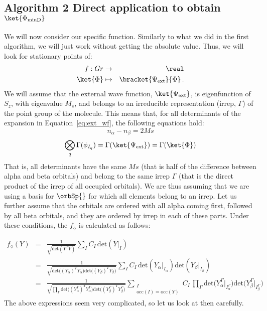 \documentclass[a4paper,11pt]{article}
\newcommand{\irp}{\ensuremath{\Gamma}}
\begin{document}
\subsection{\textsf{\LARGE Algorithm 2}
  Direct application to obtain $\ket{\Phi_\text{minD}}$}
\label{sec:alg_two}

We will now consider our specific function.
Similarly to what we did in the first algorithm, we will just work without getting the absolute value.
Thus, we will look for stationary points of:
\begin{eqnarray}
  f : Gr &\to& \real\\
  \ket{\Phi} &\mapsto& \bracket{\Psi_\text{ext}}{\Phi}\,.
\end{eqnarray}
We will assume that the external wave function, $\ket{\Psi_\text{ext}}$, is eigenfunction of $S_z$, with eigenvalue $M_s$, and belongs to an irreducible representation (irrep, $\irp$) of the point group of the molecule.
This means that, for all determinants of the expansion in Equation~\eqref{eq:ext_wf}, the following equations hold:
\begin{equation}
  n_\alpha - n_\beta = 2 Ms
\end{equation}
\begin{equation}\label{eq:irrep_condition}
  \bigotimes_q \irp(\phi_{I_q}) = \irp(\ket{\Psi_\text{ext}}) = \irp(\ket{\Phi})
\end{equation}
That is, all determinants have the same $Ms$ (that is half of the difference between alpha and beta orbitals) and belong to the same irrep $\irp$ (that is the direct product of the irrep of all occupied orbitals).
We are thus assuming that we are using a basis for $\orbSp{}$ for which all elements belong to an irrep.
Let us further assume that the orbitals are ordered with all alpha coming first, followed by all beta orbitals, and they are ordered by irrep in each of these parts.
Under these conditions, the $f_\lozenge$ is calculated as follows:

\begin{eqnarray}
  \label{eq:gen_f}
  f_\lozenge(Y)
  &=& \frac{1}{\sqrt{\text{det} \left( Y^T Y \right)}}
      \sum_{I} C_I \, \text{det} \left( Y\big|_I \right)\\
  &=& \frac{1}{\sqrt{
      \text{det} \Big( (Y_\alpha)^T Y_\alpha \Big)
      \text{det} \Big( (Y_\beta)^T Y_\beta \Big)
      }}
      \sum_{I} C_I \,
      \text{det} \left( Y_\alpha\big|_{I_\alpha} \right)
      \text{det} \left( Y_\beta\big|_{I_\beta} \right)\\\label{eq:f_diam_spin_irrep}
  &=& \frac{1}{\sqrt{
      \prod_\irp
      \text{det} \Big( (Y_\alpha^\irp)^T Y_\alpha^\irp \Big)
      \text{det} \Big( (Y_\beta^\irp)^T Y_\beta^\irp \Big)
      }}
      \sum_{\substack{I\\\text{occ}(I) = \text{occ}(Y)}} C_I \,
  \prod_\irp
  \text{det} \Big( Y_\alpha^\irp\big|_{I_\alpha^\irp} \Big)
  \text{det} \Big( Y_\beta^\irp\big|_{I_\beta^\irp} \Big)
\end{eqnarray}
The above expressions seem very complicated, so let us look at then carefully.
\end{document}
